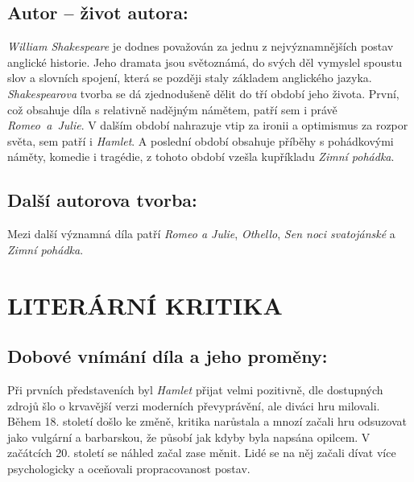 \documentclass[A4paper]{extarticle} %
\begin{document}


\subsection*{Autor {\ssmall -- život autora:}}
\noindent 
\textit{William Shakespeare} je dodnes považován za jednu z nejvýznamnějších postav anglické historie.
Jeho dramata jsou světoznámá, do svých děl vymyslel spoustu slov a slovních spojení, která se později staly základem anglického jazyka. \\
\textit{Shakespearova} tvorba se dá zjednodušeně dělit do tří období jeho života.
První, což obsahuje díla s relativně nadějným námětem, patří sem i právě \textit{Romeo~a~Julie}.
V dalším období nahrazuje vtip za ironii a optimismus za rozpor světa, sem patří i \textit{Hamlet}.
A poslední období obsahuje příběhy s pohádkovými náměty, komedie i tragédie, z tohoto období vzešla kupříkladu \textit{Zimní pohádka}.

\subsection*{Další autorova tvorba:}
\noindent 
Mezi další významná díla patří \textit{Romeo a Julie}, \textit{Othello}, \textit{Sen noci svatojánské} a \textit{Zimní pohádka}.

\section*{LITERÁRNÍ KRITIKA}

\subsection*{Dobové vnímání díla a jeho proměny:}
\noindent
Při prvních představeních byl \textit{Hamlet} přijat velmi pozitivně, dle dostupných zdrojů šlo o krvavější verzi moderních převyprávění, ale diváci hru milovali.
Během 18. století došlo ke změně, kritika narůstala a mnozí začali hru odsuzovat jako vulgární a barbarskou, že působí jak kdyby byla napsána opilcem.
V začátcích 20. století se náhled začal zase měnit.
Lidé se na něj začali dívat více psychologicky a oceňovali propracovanost postav.
\end{document}
